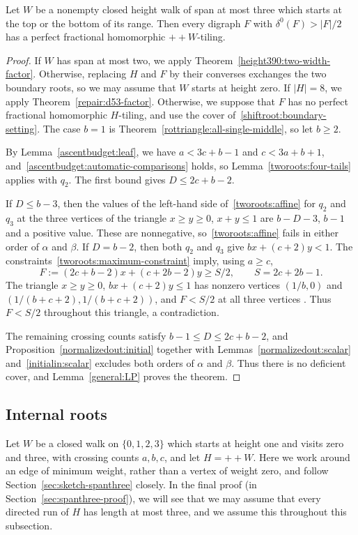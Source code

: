 \begin{theorem}
\label{initialin:all-height-three}
Let $W$ be a nonempty closed height walk of span at
most three which starts at the top or the bottom of its range.
Then every digraph $F$ with $\delta^0(F)>|F|/2$ has a perfect fractional homomorphic $++W$-tiling.
\end{theorem}
\begin{proof}
If $W$ has span at most two, we apply Theorem~\ref{height390:two-width-factor}.
Otherwise, replacing $H$ and $F$ by their converses exchanges the two
boundary roots, so we may assume that $W$ starts at height zero. If $|H|=8$, we apply Theorem~\ref{repair:d53-factor}. Otherwise, we suppose that $F$ has no perfect fractional homomorphic $H$-tiling, and use the cover of~\eqref{shiftroot:boundary-setting}.
The case $b=1$ is Theorem~\ref{rottriangle:all-single-middle}, so let $b\ge2$.

By Lemma~\ref{ascentbudget:leaf}, we have $a<3c+b-1$ and $c<3a+b+1$, and~\eqref{ascentbudget:automatic-comparisons} holds, so Lemma~\ref{tworoots:four-tails} applies with $q_2$. The first bound gives $D\le2c+b-2$.

If $D\le b-3$, then the values of the left-hand side of~\eqref{tworoots:affine} for $q_2$ and $q_3$ at the three vertices
of the triangle $x\ge y\ge0$, $x+y\le1$ are
$b-D-3$, $b-1$ and a positive value. These are nonnegative, so~\eqref{tworoots:affine} fails in either order of $\alpha$ and $\beta$.
If $D=b-2$, then both $q_2$ and $q_3$ give $bx+(c+2)y<1$. The constraints~\eqref{tworoots:maximum-constraint} imply, using $a\ge c$,
\[
 F:=(2c+b-2)x+(c+2b-2)y\ge S/2,
 \qquad S=2c+2b-1.
\]
The triangle $x\ge y\ge0$, $bx+(c+2)y\le1$ has nonzero
vertices $(1/b,0)$ and $(1/(b+c+2),1/(b+c+2))$, and $F<S/2$ at all
three vertices .
Thus $F<S/2$ throughout this triangle, a contradiction.

The remaining crossing counts satisfy $b-1\le D\le2c+b-2$, and
Proposition~\ref{normalizedout:initial} together with
Lemmas~\ref{normalizedout:scalar} and~\ref{initialin:scalar} excludes
both orders of $\alpha$ and $\beta$. Thus there is no deficient cover, and Lemma~\ref{general:LP} proves the theorem.
\end{proof}

\subsection{Internal roots}\label{sec:internalroots}
Let $W$ be a closed walk on $\{0,1,2,3\}$ which starts at height one and visits zero and three, with
crossing counts $a,b,c$, and let $H=++W$. Here we work around an edge of minimum weight, rather than a vertex of weight zero, and follow Section~\ref{sec:sketch-spanthree} closely.
In the final proof (in Section~\ref{sec:spanthree-proof}), we will see that we may assume that every directed run of $H$ has length at most
three, and we assume this throughout this subsection.

